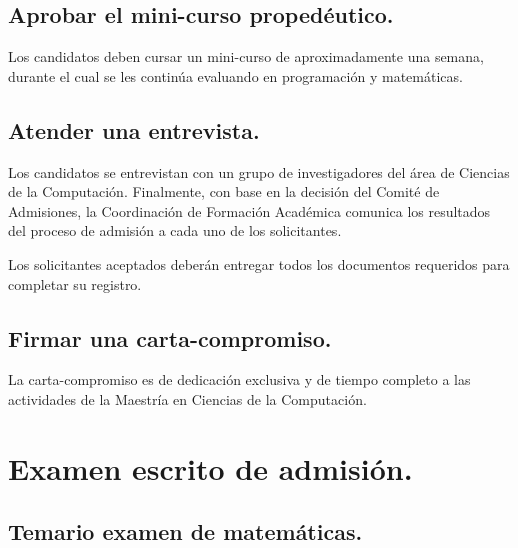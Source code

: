 \documentclass[10pt,a4paper]{book}
\begin{document}
\section{Aprobar el mini-curso propedéutico.}

Los candidatos deben cursar un mini-curso de aproximadamente una semana, durante el cual se les continúa evaluando en programación y matemáticas.

\section{Atender una entrevista.}

Los candidatos se entrevistan con un grupo de investigadores del área de Ciencias de la Computación. Finalmente, con base en la decisión del Comité de Admisiones, la Coordinación de Formación Académica comunica los resultados del proceso de admisión a cada uno de los solicitantes. 

Los solicitantes aceptados deberán entregar todos los documentos requeridos para completar su registro.

\section{Firmar una carta-compromiso.}
La carta-compromiso es de dedicación exclusiva y de tiempo completo a las actividades de la Maestría en Ciencias de la Computación.

\newpage


\chapter{Examen escrito de admisión.}

\section{Temario examen de matemáticas.}
\end{document}
